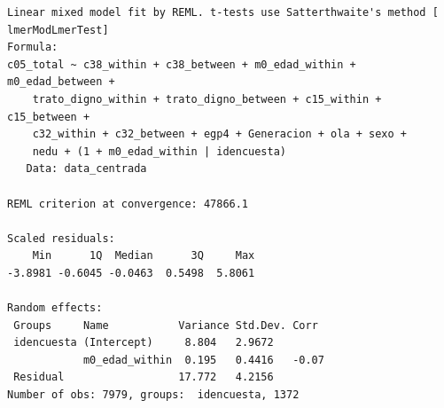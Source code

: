 \documentclass[
  spanish,
  a4paper,
  oneside]{scrbook}
\begin{document}
\begin{verbatim}
Linear mixed model fit by REML. t-tests use Satterthwaite's method [
lmerModLmerTest]
Formula: 
c05_total ~ c38_within + c38_between + m0_edad_within + m0_edad_between +  
    trato_digno_within + trato_digno_between + c15_within + c15_between +  
    c32_within + c32_between + egp4 + Generacion + ola + sexo +  
    nedu + (1 + m0_edad_within | idencuesta)
   Data: data_centrada

REML criterion at convergence: 47866.1

Scaled residuals: 
    Min      1Q  Median      3Q     Max 
-3.8981 -0.6045 -0.0463  0.5498  5.8061 

Random effects:
 Groups     Name           Variance Std.Dev. Corr 
 idencuesta (Intercept)     8.804   2.9672        
            m0_edad_within  0.195   0.4416   -0.07
 Residual                  17.772   4.2156        
Number of obs: 7979, groups:  idencuesta, 1372


\end{verbatim}
\end{document}
